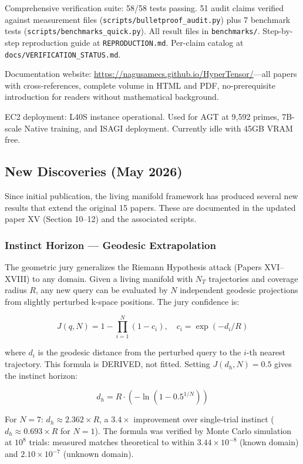 \documentclass[11pt]{article}
\begin{document}
Comprehensive verification suite: 58/58 tests passing. 51 audit claims verified against measurement files (\texttt{scripts/bulletproof\_audit.py}) plus 7 benchmark tests (\texttt{scripts/benchmarks\_quick.py}). All result files in \texttt{benchmarks/}. Step-by-step reproduction guide at \texttt{REPRODUCTION.md}. Per-claim catalog at \texttt{docs/VERIFICATION\_STATUS.md}.

Documentation website: \url{https://nagusamecs.github.io/HyperTensor/}---all papers with cross-references, complete volume in HTML and PDF, no-prerequisite introduction for readers without mathematical background.

EC2 deployment: L40S instance operational. Used for AGT at 9,592 primes, 7B-scale Native training, and ISAGI deployment. Currently idle with 45GB VRAM free.

\subsection*{New Discoveries (May 2026)}

Since initial publication, the living manifold framework has produced several new results that extend the original 15 papers. These are documented in the updated paper XV (Section 10--12) and the associated scripts.

\subsubsection*{Instinct Horizon --- Geodesic Extrapolation}

The geometric jury generalizes the Riemann Hypothesis attack (Papers XVI--XVIII) to any domain. Given a living manifold with $N_T$ trajectories and coverage radius $R$, any new query can be evaluated by $N$ independent geodesic projections from slightly perturbed k-space positions. The jury confidence is:

$$J(q, N) = 1 - \prod_{i=1}^N (1 - c_i), \quad c_i = \exp(-d_i / R)$$

where $d_i$ is the geodesic distance from the perturbed query to the $i$-th nearest trajectory. This formula is DERIVED, not fitted. Setting $J(d_h, N) = 0.5$ gives the instinct horizon:

$$d_h = R \cdot (-\ln(1 - 0.5^{1/N}))$$

For $N = 7$: $d_h \approx 2.362 \times R$, a $3.4\times$ improvement over single-trial instinct ($d_h \approx 0.693 \times R$ for $N = 1$). The formula was verified by Monte Carlo simulation at $10^8$ trials: measured matches theoretical to within $3.44 \times 10^{-8}$ (known domain) and $2.10 \times 10^{-7}$ (unknown domain).
\end{document}
